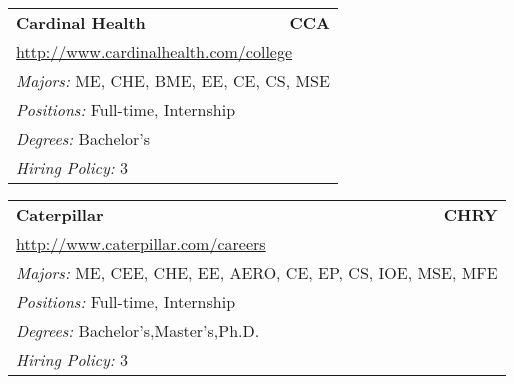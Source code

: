 \documentclass[twoside]{article}
\begin{document}
\begin{center}
\begin{multicols}{3}
\begin{FlushLeft}
\begin{minipage}{\columnwidth}
\end{minipage}
 
\begin{minipage}{\columnwidth}\begin{tabularx}{.95\columnwidth}{Xr}
                 {\Large\bf Cardinal Health} & {\Large\bf CCA}\\
    \multicolumn{2}{p{.95\columnwidth}}{\url{http://www.cardinalhealth.com/college}}\\
    \multicolumn{2}{p{.95\columnwidth}}{\emph{Majors:} ME, CHE, BME, EE, CE, CS, MSE}\\
    \multicolumn{2}{p{.95\columnwidth}}{\emph{Positions:} Full-time, Internship}\\
    \multicolumn{2}{p{.95\columnwidth}}{\emph{Degrees:} Bachelor's}\\
    \multicolumn{2}{p{.95\columnwidth}}{\emph{Hiring Policy:} 3}\\
    \end{tabularx}
    
\end{minipage}
 
\begin{minipage}{\columnwidth}\begin{tabularx}{.95\columnwidth}{Xr}
                 {\Large\bf Caterpillar} & {\Large\bf CHRY}\\
    \multicolumn{2}{p{.95\columnwidth}}{\url{http://www.caterpillar.com/careers}}\\
    \multicolumn{2}{p{.95\columnwidth}}{\emph{Majors:} ME, CEE, CHE, EE, AERO, CE, EP, CS, IOE, MSE, MFE}\\
    \multicolumn{2}{p{.95\columnwidth}}{\emph{Positions:} Full-time, Internship}\\
    \multicolumn{2}{p{.95\columnwidth}}{\emph{Degrees:} Bachelor's,Master's,Ph.D.}\\
    \multicolumn{2}{p{.95\columnwidth}}{\emph{Hiring Policy:} 3}\\
    \end{tabularx}
    
\end{minipage}
 

\end{FlushLeft}
\end{multicols}
\end{center}
\end{document}
